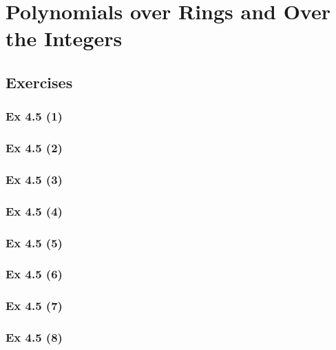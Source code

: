 \newpage		%

\section{Polynomials over Rings and Over the Integers}\label{sec:4.5}
\subsection{Exercises}\label{sec:4.5_Exercises}

\subsubsection{Ex 4.5 (1)}\label{sec:Ex_4.5.1}

\subsubsection{Ex 4.5 (2)}\label{sec:Ex_4.5.2}

\subsubsection{Ex 4.5 (3)}\label{sec:Ex_4.5.3}

\subsubsection{Ex 4.5 (4)}\label{sec:Ex_4.5.4}

\subsubsection{Ex 4.5 (5)}\label{sec:Ex_4.5.5}

\subsubsection{Ex 4.5 (6)}\label{sec:Ex_4.5.6}

\subsubsection{Ex 4.5 (7)}\label{sec:Ex_4.5.7}

\subsubsection{Ex 4.5 (8)}\label{sec:Ex_4.5.8}

